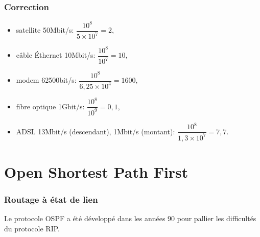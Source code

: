 \documentclass[svgnames,11pt]{beamer}
\begin{document}
\begin{frame}
    \frametitle{Correction}

    \begin{itemize}
        \item satellite 50Mbit/s: $\dfrac{10^8}{5×10^7}=2$,
        \item câble Éthernet 10Mbit/s: $\dfrac{10^8}{10^7}=10$,
        \item modem 62500bit/s: $\dfrac{10^8}{6,25×10^4}=1600$,
        \item fibre optique 1Gbit/s: $\dfrac{10^8}{10^9}=0,1$,
        \item ADSL 13Mbit/s (descendant), 1Mbit/s (montant): $\dfrac{10^8}{1,3×10^7}=7,7$.
    \end{itemize}
\end{frame}
\section{Open Shortest Path First}
\begin{frame}
    \frametitle{Routage à état de lien}

    Le protocole OSPF a été développé dans les années 90 pour pallier les difficultés du protocole RIP.

\end{frame}
\end{document}
